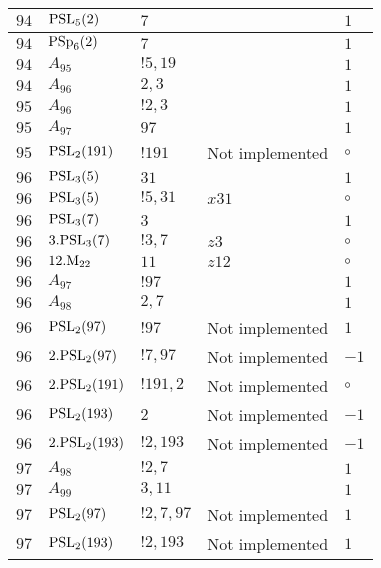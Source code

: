\documentclass[a4paper, 11pt]{article}
\begin{document}
\begin{longtable}{lllll}
        $ 94 $ & $ {\rm PSL}_{5}(2) $ & $ 7 $ & $ ~ $ & $ 1$ \\ \hline
        $ 94 $ & $ {\rm PSp}_{6}(2) $ & $ 7 $ & $ ~ $ & $ 1$ \\ \hline
        $ 94 $ & $ A_{95} $ & $ !5, 19 $ & $ ~ $ & $ 1$ \\ \hline
        $ 94 $ & $ A_{96} $ & $ 2, 3 $ & $ ~ $ & $ 1$ \\ \hline
        $ 95 $ & $ A_{96} $ & $ !2, 3 $ & $ ~ $ & $ 1$ \\ \hline
        $ 95 $ & $ A_{97} $ & $ 97 $ & $ ~ $ & $ 1$ \\ \hline
        $ 95 $ & $ {\rm PSL}_{2}(191) $ & $ !191 $ &  Not implemented &  $\circ$ \\ \hline
        $ 96 $ & $ {\rm PSL}_{3}(5) $ & $ 31 $ & $ ~ $ & $ 1$ \\ \hline
        $ 96 $ & $ {\rm PSL}_{3}(5) $ & $ ! 5,31 $ & $ x31 $ &  $\circ$ \\ \hline
        $ 96 $ & $ {\rm PSL}_{3}(7) $ & $ 3 $ & $ ~ $ & $ 1$ \\ \hline
        $ 96 $ & $ 3.{\rm PSL}_{3}(7) $ & $ ! 3,7 $ & $ z3 $ &  $\circ$ \\ \hline
        $ 96 $ & $ 12.{\rm M}_{22} $ & $ 11 $ & $ z12 $ &  $\circ$ \\ \hline
        $ 96 $ & $ A_{97} $ & $ !97 $ & $ ~ $ & $ 1$ \\ \hline
        $ 96 $ & $ A_{98} $ & $ 2, 7 $ & $ ~ $ & $ 1$ \\ \hline
        $ 96 $ & $ {\rm PSL}_{2}(97) $ & $ !97 $ &  Not implemented & $ 1$ \\ \hline
        $ 96 $ & $ 2.{\rm PSL}_{2}(97) $ & $ !7, 97 $ &  Not implemented & $ -1$ \\ \hline
        $ 96 $ & $ 2.{\rm PSL}_{2}(191) $ & $ !191, 2 $ &  Not implemented &  $\circ$ \\ \hline
        $ 96 $ & $ {\rm PSL}_{2}(193) $ & $ 2 $ &  Not implemented & $ -1$ \\ \hline
        $ 96 $ & $ 2.{\rm PSL}_{2}(193) $ & $ !2, 193 $ &  Not implemented & $ -1$ \\ \hline
        $ 97 $ & $ A_{98} $ & $ !2, 7 $ & $ ~ $ & $ 1$ \\ \hline
        $ 97 $ & $ A_{99} $ & $ 3, 11 $ & $ ~ $ & $ 1$ \\ \hline
        $ 97 $ & $ {\rm PSL}_{2}(97) $ & $ !2, 7, 97 $ &  Not implemented & $ 1$ \\ \hline
        $ 97 $ & $ {\rm PSL}_{2}(193) $ & $ !2, 193 $ &  Not implemented & $ 1$ \\ \hline

\end{longtable}
\end{document}
